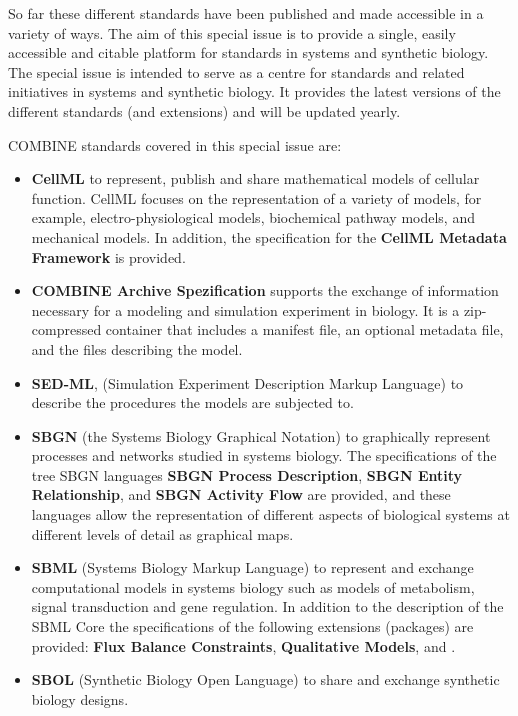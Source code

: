 \documentclass{jib}
\begin{document}
So far these different standards have been published and made accessible in a variety of ways. The aim of this special issue is to provide a single, easily accessible and citable platform for standards in systems and synthetic biology. The special issue is intended to serve as a centre for standards and related initiatives in systems and synthetic biology. It provides the latest versions of the different standards (and extensions) and will be updated yearly. 

COMBINE standards covered in this special issue are:
\begin{itemize}
\item {\bf CellML} to represent, publish and share mathematical models of cellular function. CellML focuses on the representation of a variety of models, for example, electro-physiological models, biochemical pathway models, and mechanical models. In addition, the specification for the {\bf CellML Metadata Framework} is provided.

\item {\bf COMBINE Archive Spezification} supports the exchange of information necessary for a modeling and simulation experiment in biology. It is a zip-compressed container that includes a manifest file, an optional metadata file, and the files describing the model. 

\item {\bf SED-ML}, (Simulation Experiment Description Markup Language) to describe the procedures the models are subjected to.

\item {\bf SBGN} (the Systems Biology Graphical Notation) to graphically represent processes and networks studied in systems biology. The specifications of the tree SBGN languages {\bf SBGN Process Description}, {\bf SBGN Entity Relationship}, and {\bf SBGN Activity Flow} are provided, and these languages allow the representation of different aspects of biological systems at different levels of detail as  graphical maps.

\item {\bf SBML} (Systems Biology Markup Language) to represent and exchange computational models in systems biology such as models of metabolism, signal transduction and gene regulation. In addition to the description of the SBML Core the specifications of the following extensions (packages) are provided:  {\bf Flux Balance Constraints}, {\bf Qualitative Models}, and {\bf }.

\item {\bf SBOL} (Synthetic Biology Open Language) to share and exchange synthetic biology designs.
\end{itemize}
\end{document}
